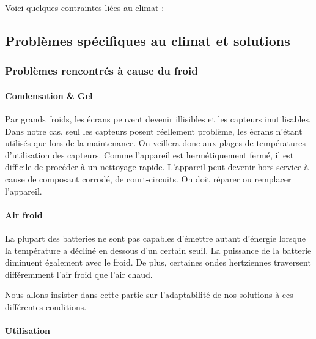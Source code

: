 Voici quelques contraintes liées au climat :

\subsection{Problèmes spécifiques au climat et solutions}

\subsubsection{Problèmes rencontrés à cause du froid}

\paragraph{Condensation \&  Gel}

Par grands froids, les écrans peuvent devenir illisibles et les capteurs inutilisables. Dans notre cas, seul les capteurs posent réellement problème, les écrans n'étant utilisés que lors de la maintenance. On veillera donc aux plages de températures d'utilisation des capteurs.
Comme l’appareil est hermétiquement fermé, il est difficile de procéder à un nettoyage rapide. L’appareil peut devenir hors-service à cause de composant corrodé, de court-circuits. On doit réparer ou remplacer l’appareil.

\paragraph{Air froid}

La plupart des batteries ne sont pas capables d’émettre autant d'énergie lorsque la température a décliné en dessous d'un certain seuil. La puissance de la batterie diminuent également avec le froid.
De plus, certaines ondes hertziennes traversent différemment l’air froid que l’air chaud\footnotemark.


Nous allons insister dans cette partie sur l'adaptabilité de nos solutions à ces différentes conditions.


\paragraph{Utilisation}

